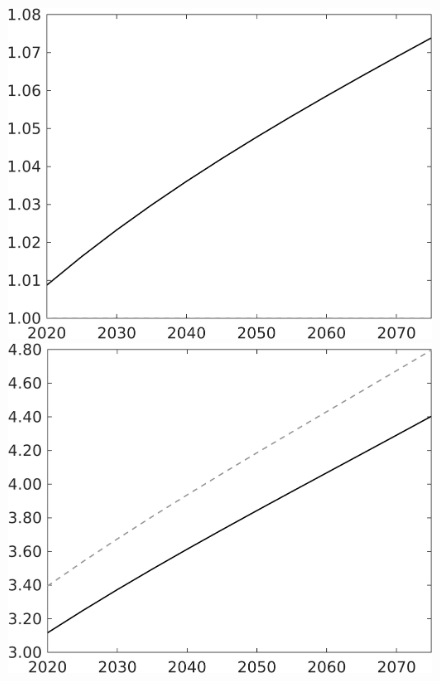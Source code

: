 \begin{figure}[h!!]
\begin{minipage}[]{0.32\textwidth}
\end{minipage}	
\begin{minipage}[]{0.32\textwidth}
	\includegraphics[width=1\textwidth]{../../codding_model/own_basedOnFried/optimalPol_010922_revision/figures/all_13Sept22/CompTaul_Equlab_LFBAU_Reg0_lambdaa_spillover0_nsk1_xgr1_knspil1_sep1_countec0_GovRev0_etaa0.79_lgd0.png}
\end{minipage}	
\begin{minipage}[]{0.32\textwidth}
\includegraphics[width=1\textwidth]{../../codding_model/own_basedOnFried/optimalPol_010922_revision/figures/all_13Sept22/CompTaul_Equlab_LFBAU_Reg0_Y_spillover0_nsk1_xgr1_knspil1_sep1_countec0_GovRev0_etaa0.79_lgd0.png}

\end{minipage}
\end{figure}
